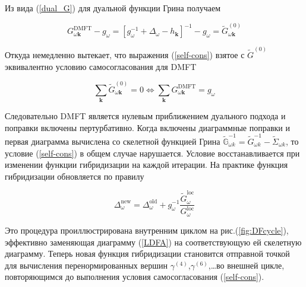 \documentclass[11pt,a4paper]{report}
\begin{document}
Из вида (\ref{dual_G}) для дуальной функции Грина получаем

\begin{equation}
 G^{\text{DMFT}}_{\omega\mathbf{k}} - g_\omega = \left[g_\omega^{-1}+\Delta_\omega-h_\mathbf{k}\right]^{-1}-g_\omega = \tilde{G}^{(0)}_{\omega\mathbf{k}}
\end{equation}

Откуда немедленно вытекает, что выражения (\ref{self-cons}) взятое с $\tilde{G}^{(0)}$ эквивалентно условию самосогласования для DMFT 

\begin{equation}
 \sum_{\mathbf{k}} \tilde{G}^{(0)}_{\omega\mathbf{k}} = 0 \Longleftrightarrow \sum_{\mathbf{k}} G^{\text{DMFT}}_{\omega\mathbf{k}} = g_\omega
\end{equation}

Следовательно DMFT является нулевым приближением дуального подхода и поправки включены пертурбативно. Когда включены диаграммные поправки и первая диаграмма вычислена со скелетной функцией Грина
$\tilde{\mathbb{G}}^{-1}_{\omega k} = \tilde{G}^{-1}_{\omega k} - \tilde{\Sigma}_{\omega k}$,
то условие (\ref{self-cons}) в общем случае нарушается. Условие восстанавливается при изменении функции гибридизации на каждой итерации. На практике функция гибридизации обновляется по правилу

\begin{equation}
 \Delta^{\text{new}}_\omega = \Delta^{\text{old}}_\omega + g_\omega^{-1}\frac{\tilde{G}^{\text{loc}}_\omega}{G^{\text{loc}}_\omega}
\end{equation}

Это процедура проиллюстрирована внутренним циклом на рис.(\ref{fig:DFcycle}), эффективно заменяющая диаграмму (\ref{LDFA}) на соответствующую ей скелетную диаграмму. 
Теперь новая функция гибридизации становится отправной точкой для вычисления перенормированных вершин $\gamma^{(4)}$,$\gamma^{(6)}$,\dots во внешней цикле, повторяющимся до выполнения условия
самосогласования (\ref{self-cons}).
\end{document}
